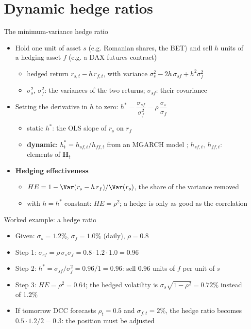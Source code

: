 \section{Dynamic hedge ratios}

\begin{frame}{The minimum-variance hedge ratio}
\itemsize{\footnotesize}
\begin{itemize}
    \item Hold one unit of asset $s$ (e.g. Romanian shares, the BET) and sell $h$ units of a hedging asset $f$ (e.g. a DAX futures contract)
    \begin{itemize}
        \item hedged return $r_{s,t} - h\,r_{f,t}$, with variance $\sigma_s^2 - 2h\,\sigma_{sf} + h^2\sigma_f^2$
        \item $\sigma_s^2$, $\sigma_f^2$: the variances of the two returns; $\sigma_{sf}$: their covariance
    \end{itemize}
    \item Setting the derivative in $h$ to zero: $h^* = \dfrac{\sigma_{sf}}{\sigma_f^2} = \rho\,\dfrac{\sigma_s}{\sigma_f}$ 
    \begin{itemize}
        \item static $h^*$: the OLS slope of $r_s$ on $r_f$
        \item \textbf{dynamic}: $h_t^* = h_{sf,t}/h_{ff,t}$ from an MGARCH model ; $h_{sf,t}$, $h_{ff,t}$: elements of $\mathbf{H}_t$
    \end{itemize}
    \item \textbf{Hedging effectiveness}
    \begin{itemize}
        \item $HE = 1 - \Var(r_s - h\,r_f)/\Var(r_s)$, the share of the variance removed
        \item with $h = h^*$ constant: $HE = \rho^2$; a hedge is only as good as the correlation
    \end{itemize}
\end{itemize}
\end{frame}

\begin{frame}{Worked example: a hedge ratio}
\itemsize{\small}
\begin{itemize}
    \item Given: $\sigma_s = 1.2\%$, $\sigma_f = 1.0\%$ (daily), $\rho = 0.8$
    \item Step 1: $\sigma_{sf} = \rho\,\sigma_s\sigma_f = 0.8 \cdot 1.2 \cdot 1.0 = 0.96$
    \item Step 2: $h^* = \sigma_{sf}/\sigma_f^2 = 0.96/1 = 0.96$: sell 0.96 units of $f$ per unit of $s$
    \item Step 3: $HE = \rho^2 = 0.64$; the hedged volatility is $\sigma_s\sqrt{1 - \rho^2} = 0.72\%$ instead of 1.2\%
    \item If tomorrow DCC forecasts $\rho_t = 0.5$ and $\sigma_{f,t} = 2\%$, the hedge ratio becomes $0.5 \cdot 1.2/2 = 0.3$: the position must be adjusted
\end{itemize}
\end{frame}

